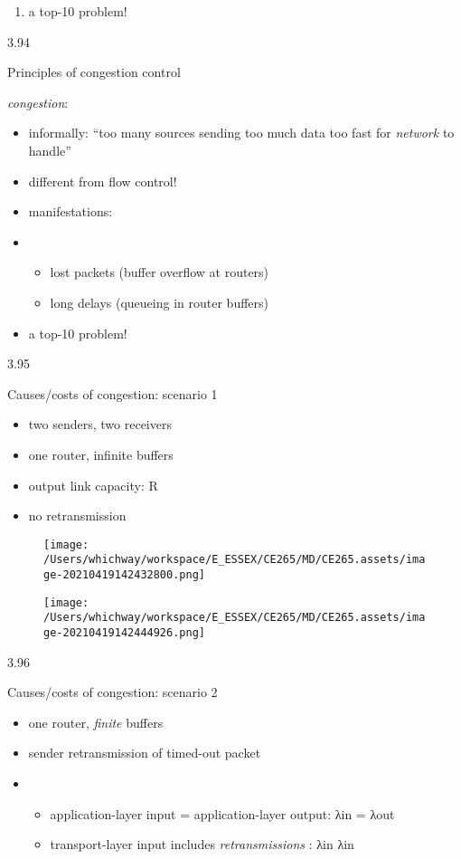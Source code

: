 \documentclass[
]{article}
\begin{document}
\begin{enumerate}
\def\labelenumi{\arabic{enumi}.}
\item
  a top-10 problem!
\end{enumerate}

3.94

Principles of congestion control

\emph{congestion}:

\begin{itemize}
\item
  informally: ``too many sources sending too much data too fast for
  \emph{network} to handle''
\item
  different from flow control!
\item
  manifestations:
\item
  \begin{itemize}
  \item
    lost packets (buffer overflow at routers)
  \item
    long delays (queueing in router buffers)
  \end{itemize}
\item
  a top-10 problem!
\end{itemize}

3.95

Causes/costs of congestion: scenario 1

\begin{itemize}
\item
  two senders, two receivers
\item
  one router, infinite buffers
\item
  output link capacity: R
\item
  no retransmission
\end{itemize}

\begin{figure}
\centering
\texttt{[image: /Users/whichway/workspace/E\_ESSEX/CE265/MD/CE265.assets/image-20210419142432800.png]}
\caption{}
\end{figure}

\begin{figure}
\centering
\texttt{[image: /Users/whichway/workspace/E\_ESSEX/CE265/MD/CE265.assets/image-20210419142444926.png]}
\caption{}
\end{figure}

3.96

Causes/costs of congestion: scenario 2

\begin{itemize}
\item
  one router, \emph{finite} buffers
\item
  sender retransmission of timed-out packet
\item
  \begin{itemize}
  \item
    application-layer input = application-layer output: λin = λout
  \item
    transport-layer input includes \emph{retransmissions} : λin λin
  \end{itemize}
\end{itemize}
\end{document}
